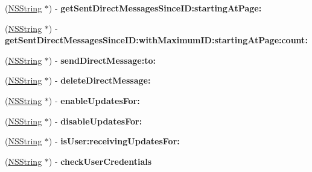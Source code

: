 \begin{DoxyCompactItemize}
\item 
\hypertarget{interface_m_g_twitter_engine_a2673daf8b082b440ceb04e2044dc5963}{
(\hyperlink{class_n_s_string}{\-N\-S\-String} $\ast$) -\/ {\bfseries get\-Sent\-Direct\-Messages\-Since\-I\-D\-:starting\-At\-Page\-:}}
\label{interface_m_g_twitter_engine_a2673daf8b082b440ceb04e2044dc5963}

\item 
\hypertarget{interface_m_g_twitter_engine_ae16fe04b969e44769d2939f682f94eae}{
(\hyperlink{class_n_s_string}{\-N\-S\-String} $\ast$) -\/ {\bfseries get\-Sent\-Direct\-Messages\-Since\-I\-D\-:with\-Maximum\-I\-D\-:starting\-At\-Page\-:count\-:}}
\label{interface_m_g_twitter_engine_ae16fe04b969e44769d2939f682f94eae}

\item 
\hypertarget{interface_m_g_twitter_engine_a186e34a3636693d8b2a1dfd4a83bcd16}{
(\hyperlink{class_n_s_string}{\-N\-S\-String} $\ast$) -\/ {\bfseries send\-Direct\-Message\-:to\-:}}
\label{interface_m_g_twitter_engine_a186e34a3636693d8b2a1dfd4a83bcd16}

\item 
\hypertarget{interface_m_g_twitter_engine_addaacdd1ca2dd3fadb581bd56e9a80ea}{
(\hyperlink{class_n_s_string}{\-N\-S\-String} $\ast$) -\/ {\bfseries delete\-Direct\-Message\-:}}
\label{interface_m_g_twitter_engine_addaacdd1ca2dd3fadb581bd56e9a80ea}

\item 
\hypertarget{interface_m_g_twitter_engine_a1624a69c9bd1dcd22f57aa3e6ee0fac0}{
(\hyperlink{class_n_s_string}{\-N\-S\-String} $\ast$) -\/ {\bfseries enable\-Updates\-For\-:}}
\label{interface_m_g_twitter_engine_a1624a69c9bd1dcd22f57aa3e6ee0fac0}

\item 
\hypertarget{interface_m_g_twitter_engine_a5524857888e13e7efd9f71fc0a7e31cc}{
(\hyperlink{class_n_s_string}{\-N\-S\-String} $\ast$) -\/ {\bfseries disable\-Updates\-For\-:}}
\label{interface_m_g_twitter_engine_a5524857888e13e7efd9f71fc0a7e31cc}

\item 
\hypertarget{interface_m_g_twitter_engine_a14bc9ae997631519263d6faac1f7f24b}{
(\hyperlink{class_n_s_string}{\-N\-S\-String} $\ast$) -\/ {\bfseries is\-User\-:receiving\-Updates\-For\-:}}
\label{interface_m_g_twitter_engine_a14bc9ae997631519263d6faac1f7f24b}

\item 
\hypertarget{interface_m_g_twitter_engine_a35842c057f70b8a85e85e66f5cdde346}{
(\hyperlink{class_n_s_string}{\-N\-S\-String} $\ast$) -\/ {\bfseries check\-User\-Credentials}}
\label{interface_m_g_twitter_engine_a35842c057f70b8a85e85e66f5cdde346}


\end{DoxyCompactItemize}
